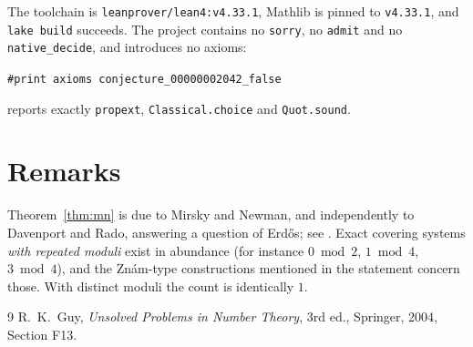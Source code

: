\documentclass[11pt]{article}
\theoremstyle{plain}
\theoremstyle{definition}
\theoremstyle{remark}
\begin{document}
The toolchain is \texttt{leanprover/lean4:v4.33.1}, Mathlib is pinned to
\texttt{v4.33.1}, and \texttt{lake build} succeeds. The project contains no
\texttt{sorry}, no \texttt{admit} and no \texttt{native\_decide}, and
introduces no axioms:
\begin{center}
\texttt{\#print axioms conjecture\_00000002042\_false}
\end{center}
reports exactly \texttt{propext}, \texttt{Classical.choice} and
\texttt{Quot.sound}.

\section{Remarks}

Theorem~\ref{thm:mn} is due to Mirsky and Newman, and independently to
Davenport and Rado, answering a question of Erd\H{o}s; see \cite{guy}. Exact
covering systems \emph{with repeated moduli} exist in abundance (for instance
$0\bmod2$, $1\bmod4$, $3\bmod4$), and the Zn\'am-type constructions mentioned
in the statement concern those. With distinct moduli the count is identically
$1$.

\begin{thebibliography}{9}
 R.~K.~Guy, \emph{Unsolved Problems in Number Theory}, 3rd ed.,
  Springer, 2004, Section F13.
\end{thebibliography}
\end{document}

